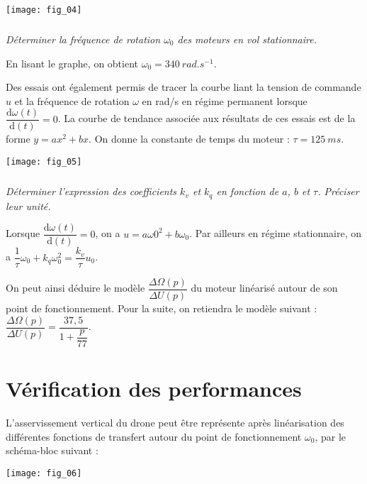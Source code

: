 \begin{multicols}{2}
\begin{center}
\texttt{[image: fig\_04]}
\end{center}

\subparagraph{}\textit{Déterminer la fréquence de rotation $\omega_0$ des
moteurs en vol stationnaire.}
\ifprof
\begin{corrige}
En lisant le graphe, on obtient $\omega_0=\SI{340}{rad.s^{-1}}$.
\end{corrige}
\else
\fi



Des essais ont également permis de tracer la
courbe liant la tension de commande $u$ et la
fréquence de rotation $\omega$ en rad/s en régime
permanent lorsque $\dfrac{\text{d}\omega(t)}{\text{d}(t)}=0$. La courbe de tendance associée aux résultats de
ces essais est de la forme $y=ax^2+bx$. On donne la constante de temps du moteur :
$\tau=\SI{125}{ms}$.

\begin{center}
\texttt{[image: fig\_05]}
\end{center}

\subparagraph{}\textit{Déterminer l'expression des coefficients $k_v$ et $k_q$ en fonction de $a$, $b$ et $\tau$. Préciser leur unité.}
\ifprof
\begin{corrige}
Lorsque $\dfrac{\text{d}\omega(t)}{\text{d}(t)}=0$, on a  $u=a\omega0^2+b\omega_0$. Par ailleurs en régime stationnaire, on a $\dfrac{1}{\tau}\omega_0 +k_q\omega_0^2 = \dfrac{k_v}{\tau}u_0$.
\end{corrige}
\else
\fi

On peut ainsi déduire le modèle $\dfrac{\Delta \Omega(p)}{\Delta U(p)}$ du moteur linéarisé autour de son point de fonctionnement. Pour la suite, on retiendra le modèle suivant : $\dfrac{\Delta \Omega(p)}{\Delta U(p)}=\dfrac{37,5}{1+\dfrac{p}{77}}$.

\section*{Vérification des performances}

L'asservissement vertical du drone peut être représente après linéarisation des différentes fonctions de
transfert autour du point de fonctionnement $\omega_0$, par le schéma-bloc suivant :

\begin{center}
\texttt{[image: fig\_06]}
\end{center}




\end{multicols}
